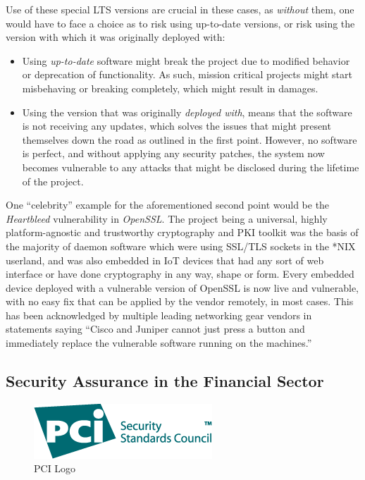 \documentclass[a4paper,12pt]{article}
\begin{document}
	Use of these special LTS versions are crucial in these cases, as \textit{without} them, one would have to face a choice as to risk using up-to-date versions, or risk using the version with which it was originally deployed with:
	
	\begin{itemize}
		\item Using \textit{up-to-date} software might break the project due to modified behavior or deprecation of functionality. As such, mission critical projects might start misbehaving or breaking completely, which might result in damages.
		\item Using the version that was originally \textit{deployed with}, means that the software is not receiving any updates, which solves the issues that might present themselves down the road as outlined in the first point. However, no software is perfect, and without applying any security patches, the system now becomes vulnerable to any attacks that might be disclosed during the lifetime of the project.
	\end{itemize}
	
	One ``celebrity'' example for the aforementioned second point would be the \textit{Heartbleed} vulnerability in \textit{OpenSSL}. The project being a universal, highly platform-agnostic and trustworthy cryptography and PKI toolkit was the basis of the majority of daemon software which were using SSL/TLS sockets in the *NIX userland, and was also embedded in IoT devices that had any sort of web interface or have done cryptography in any way, shape or form. Every embedded device deployed with a vulnerable version of OpenSSL is now live and vulnerable, with no easy fix that can be applied by the vendor remotely, in most cases. This has been acknowledged by multiple leading networking gear vendors in statements saying ``Cisco and Juniper cannot just press a button and immediately replace the vulnerable software running on the machines.''\cite{jpaglier14}
	
\subsection{Security Assurance in the Financial Sector} \label{secassfinsec}
 

	\begin{figure}
		\vspace{-10pt}
		\centering
		\includegraphics[scale=0.5]{pci.png}
		\caption[Payment Card Industry Data Security Standard logo]{PCI Logo\cite{pcidss31}}
	\end{figure}
\end{document}
